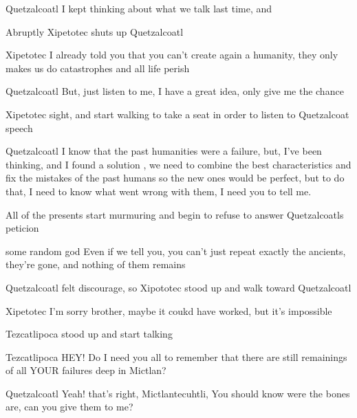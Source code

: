 \documentclass{screenplay}[2012/06/30]
\begin{document}
\begin{dialogue}{Quetzalcoatl}
I kept thinking about what we talk last time, and
\end{dialogue}

Abruptly Xipetotec shuts up Quetzalcoatl

\begin{dialogue}{Xipetotec}
I already told you that you can't create again a humanity, they only makes us do catastrophes and all life perish
\end{dialogue}

\begin{dialogue}{Quetzalcoatl}
But, just listen to me, I have a great idea, only give me the chance
\end{dialogue}

Xipetotec sight, and start walking to take a seat in order to listen to Quetzalcoat speech


\begin{dialogue}[continuing]{Quetzalcoatl}
I know that the past humanities were a failure, but, I've been thinking, and I found a solution , we need to combine the best characteristics and fix the mistakes of the past humans so the new ones would be perfect, but to do that, I need to know what went wrong with them, I need you to tell me.
\end{dialogue}

All of the presents start murmuring and begin to refuse to answer Quetzalcoatls peticion

\begin{dialogue}{some random god}
Even if we tell you, you can't just repeat exactly the ancients, they're gone, and nothing of them remains
\end{dialogue}

Quetzalcoatl felt discourage, so Xipototec stood up and walk toward Quetzalcoatl

\begin{dialogue}{Xipetotec}
I'm sorry brother, maybe it coukd have worked, but it's impossible
\end{dialogue}

Tezcatlipoca stood up and start talking

\begin{dialogue}{Tezcatlipoca}
HEY! Do I need you all to remember that there are still remainings of all YOUR failures deep in Mictlan? 
\end{dialogue}


\begin{dialogue}{Quetzalcoatl}
Yeah! that's right, Mictlantecuhtli, You should know were the bones are, can you give them to me?
\end{dialogue}
\end{document}
